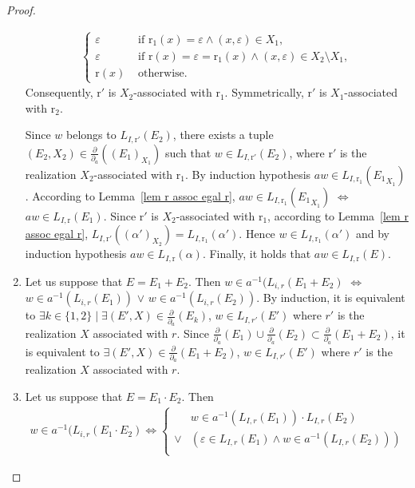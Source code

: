 \documentclass[a4paper]{llncs}
\begin{document}
\begin{proof}
\begin{enumerate}
\begin{align*}
\begin{cases}
            \varepsilon & \text{ if } \mathrm{r}_1(x)=\varepsilon \wedge (x,\varepsilon)\in X_1,\\
            \varepsilon & \text{ if } \mathrm{r}(x)=\varepsilon=\mathrm{r}_1(x) \wedge (x,\varepsilon)\in X_2\setminus X_1,\\
            \mathrm{r}(x) & \text{ otherwise.}
          \end{cases}
        \end{align*}
    Consequently, $\mathrm{r}'$ is $X_2$-associated with $\mathrm{r}_1$. Symmetrically, $\mathrm{r}'$ is $X_1$-associated with $\mathrm{r}_2$.
    
      Since $w$ belongs to $L_{I,\mathrm{r}'}(E_2)$, there exists a tuple $(E_2,X_2)\in\frac{\partial}{\partial_a}((E_1)_{X_1})$ such that $w \in L_{I,\mathrm{r}'}(E_2)$, where $\mathrm{r}'$ is the realization $X_2$-associated with $\mathrm{r}_1$. By induction hypothesis $aw\in L_{I,\mathrm{r}_1}({E_1}_{X_1})$. According to Lemma~\ref{lem r assoc egal r}, $aw\in L_{I,\mathrm{r}_1}({E_1}_{X_1})$ $\Leftrightarrow$ $aw\in L_{I,\mathrm{r}}({E_1})$. Since $\mathrm{r}'$ is $X_2$-associated with $\mathrm{r}_1$, according to Lemma~\ref{lem r assoc egal r}, $L_{I,\mathrm{r}'}((\alpha')_{X_2})=L_{I,\mathrm{r}_1}(\alpha')$. Hence $w\in L_{I,\mathrm{r}_1}(\alpha')$ and by induction hypothesis $aw\in L_{I,\mathrm{r}}(\alpha)$.      
      Finally, it holds that $aw\in L_{I,\mathrm{r}}(E)$.
\item Let us suppose that $E=E_1 + E_2$. Then       
      $w\in a^{-1}(L_{i,r}(E_1+ E_2)$      
      $\Leftrightarrow$ $w\in a^{-1}(L_{i,r}(E_1))$ $\vee$ $w\in a^{-1}(L_{i,r}(E_2))$.      
      By induction, it is equivalent to $\exists k\in\{1,2\} \mid \exists (E',X)\in\frac{\partial}{\partial_a}(E_k)$, $w\in L_{I,r'}(E')$ where $r'$ is the realization $X$ associated with $r$.       
      Since $\frac{\partial}{\partial_a}(E_1)\cup \frac{\partial}{\partial_a}(E_2)\subset \frac{\partial}{\partial_a}(E_1+E_2)$, it is equivalent to $\exists (E',X)\in\frac{\partial}{\partial_a}(E_1+E_2)$, $w\in L_{I,r'}(E')$ where $r'$ is the realization $X$ associated with $r$.
\item Let us suppose that $E=E_1\cdot E_2$. Then 
        \begin{align*}
        w\in a^{-1}(L_{i,r}(E_1\cdot E_2)
        \Leftrightarrow
        \begin{cases}
          & w\in a^{-1}(L_{I,r}(E_1))\cdot L_{I,r}(E_2)\\
          \vee &  (\varepsilon\in L_{I,r}(E_1) \wedge w\in a^{-1}(L_{I,r}(E_2)))\\

\end{cases}
\end{align*}
\end{enumerate}
\end{proof}
\end{document}
